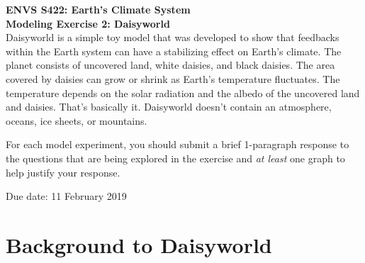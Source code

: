 \documentclass[11pt,letterpaper]{article}
\begin{document}
\textbf{ENVS S422: Earth's Climate System\\
Modeling Exercise 2: Daisyworld}\\%

Daisyworld is a simple toy model that was developed to show that feedbacks within the Earth system can have a stabilizing effect on Earth's climate. The planet consists of uncovered land, white daisies, and black daisies. The area covered by daisies can grow or shrink as Earth's temperature fluctuates. The temperature depends on the solar radiation and the albedo of the uncovered land and daisies. That's basically it. Daisyworld doesn't contain an atmosphere, oceans, ice sheets, or mountains.

For each model experiment, you should submit a brief 1-paragraph response to the questions that are being explored in the exercise and \textit{at least} one graph to help justify your response.

Due date: 11 February 2019

\section{Background to Daisyworld}
\end{document}
